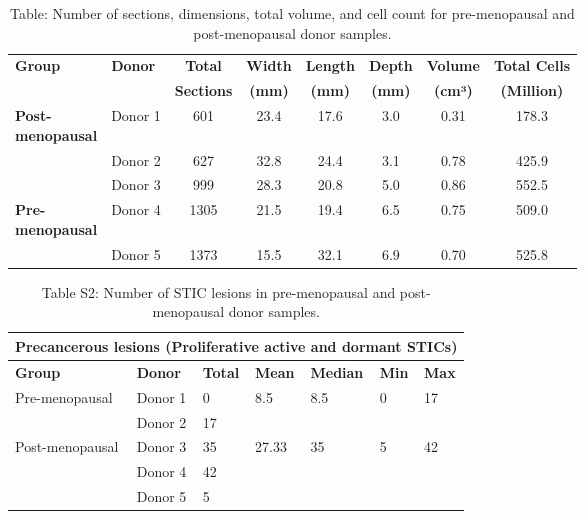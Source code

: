 \begin{refsection}
    \begin{table}[htbp]
        \centering
        \footnotesize
        \renewcommand{\arraystretch}{1.2}
        \caption{Table: Number of sections, dimensions, total volume, and cell count for pre-menopausal and post-menopausal donor samples.}
        \begin{tabularx}{\textwidth}{l l c c c c c c}
            \toprule
            \textbf{Group} & \textbf{Donor} & \textbf{Total} & \textbf{Width} & \textbf{Length} & \textbf{Depth} & \textbf{Volume} & \textbf{Total Cells} \\
            & & \textbf{Sections} & \textbf{(mm)} & \textbf{(mm)} & \textbf{(mm)} & \textbf{(cm³)} & \textbf{(Million)} \\
            \midrule
            \makecell[l]{\textbf{Post-}\\\textbf{menopausal}} & Donor 1 & 601 & 23.4 & 17.6 & 3.0 & 0.31 & 178.3 \\
            & Donor 2 & 627 & 32.8 & 24.4 & 3.1 & 0.78 & 425.9 \\
            & Donor 3 & 999 & 28.3 & 20.8 & 5.0 & 0.86 & 552.5 \\
            \makecell[l]{\textbf{Pre-}\\\textbf{menopausal}} & Donor 4 & 1305 & 21.5 & 19.4 & 6.5 & 0.75 & 509.0 \\
            & Donor 5 & 1373 & 15.5 & 32.1 & 6.9 & 0.70 & 525.8 \\
            \bottomrule
        \end{tabularx}
    \end{table}
    
    \begin{table}[htbp]
        \centering
        \renewcommand{\arraystretch}{1.2}
        \caption{Table S2: Number of STIC lesions in pre-menopausal and post-menopausal donor samples.}
        \begin{tabularx}{\textwidth}{l l X X X X X}
            \toprule
            \multicolumn{7}{c}{\textbf{Precancerous lesions (Proliferative active and dormant STICs)}} \\
            \midrule
            \textbf{Group} & \textbf{Donor} & \textbf{Total} & \textbf{Mean} & \textbf{Median} & \textbf{Min} & \textbf{Max} \\
            \midrule
            Pre-menopausal & Donor 1 & 0 & 8.5 & 8.5 & 0 & 17 \\
            & Donor 2 & 17 &  &  &  &  \\
            Post-menopausal & Donor 3 & 35 & 27.33 & 35 & 5 & 42 \\
            & Donor 4 & 42 &  &  &  &  \\
            & Donor 5 & 5 &  &  &  &  \\
            \bottomrule
        \end{tabularx}
    \end{table}
    

\end{refsection}
